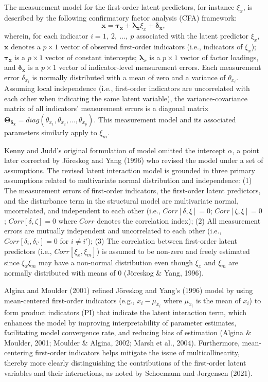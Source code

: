\documentclass[
  man]{apa6}
\begin{document}
The measurement model for the first-order latent predictors, for instance \(\xi_{x}\), is described by the following confirmatory factor analysis (CFA) framework:
\begin{equation}
\mathbf{x} = \boldsymbol{\tau_{x}} + \boldsymbol{\lambda_{x}}\xi_{x} + \boldsymbol{\delta_{x}},
\end{equation}
wherein, for each indicator \(i = 1, \ 2, \ ..., \ p\) associated with the latent predictor \(\xi_{x}\), \(\mathbf{x}\) denotes a \(p \times 1\) vector of observed first-order indicators (i.e., indicators of \(\xi_{x}\)); \(\boldsymbol{{\tau_{x}}}\) is a \(p \times 1\) vector of constant intercepts; \(\boldsymbol{\lambda}_{x}\) is a \(p \times 1\) vector of factor loadings, and \(\boldsymbol{\delta_{x}}\) is a \(p \times 1\) vector of indicator-level measurement errors. Each measurement error \(\delta_{x_{i}}\) is normally distributed with a mean of zero and a variance of \(\theta_{x_{i}}\). Assuming local independence (i.e., first-order indicators are uncorrelated with each other when indicating the same latent variable), the variance-covariance matrix of all indicators' measurement errors is a diagonal matrix \(\mathbf{\Theta_{\delta_{x}}} = diag(\theta_{x_{1}}, \theta_{x_{2}}, ..., \theta_{x_{p}})\). This measurement model and its associated parameters similarly apply to \(\xi_{m}\).

Kenny and Judd's original formulation of model omitted the intercept \(\alpha\), a point later corrected by Jöreskog and Yang (1996) who revised the model under a set of assumptions. The revised latent interaction model is grounded in three primary assumptions related to multivariate normal distribution and independence: (1) The measurement errors of first-order indicators, the first-order latent predictors, and the disturbance term in the structural model are multivariate normal, uncorrelated, and independent to each other (i.e., \(Corr[\delta, \xi] = 0\); \(Corr[\zeta, \xi] = 0\); \(Corr[\delta, \zeta] = 0\) where \(Corr\) denotes the correlation index); (2) All measurement errors are mutually independent and uncorrelated to each other (i.e., \(Corr[\delta_{i}, \delta_{i'}] = 0\) for \(i \neq i'\)); (3) The correlation between first-order latent predictors (i.e., \(Corr[\xi_{x}, \xi_{m}]\)) is assumed to be non-zero and freely estimated since \(\xi_{x}\xi_{m}\) may have a non-normal distribution even though \(\xi_{x}\) and \(\xi_{m}\) are normally distributed with means of 0 (Jöreskog \& Yang, 1996).

Algina and Moulder (2001) refined Jöreskog and Yang's (1996) model by using mean-centered first-order indicators (e.g., \(x_{i} - \mu_{x_{i}}\) where \(\mu_{x_{i}}\) is the mean of \(x_{i}\)) to form product indicators (PI) that indicate the latent interaction term, which enhances the model by improving interpretability of parameter estimates, facilitating model convergence rate, and reducing bias of estimation (Algina \& Moulder, 2001; Moulder \& Algina, 2002; Marsh et al., 2004). Furthermore, mean-centering first-order indicators helps mitigate the issue of multicollinearity, thereby more clearly distinguishing the contributions of the first-order latent variables and their interactions, as noted by Schoemann and Jorgensen (2021).
\end{document}
